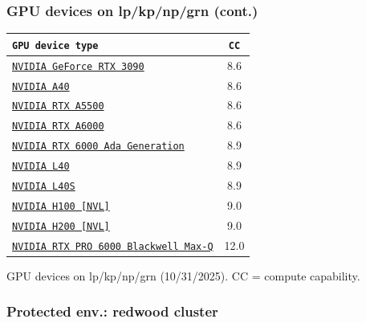 \begin{frame}
  \frametitle{GPU devices on lp/kp/np/grn (cont.)}
  \begin{center}
    \small
    \begin{tabular}{l|c}
      \texttt{GPU device type} & \texttt{CC} \\
      \hline
      \href{https://www.nvidia.com/en-us/geforce/graphics-cards/30-series/rtx-3090-3090ti/}{\texttt{NVIDIA GeForce RTX 3090}} & 8.6 \\
      \href{https://images.nvidia.com/content/Solutions/data-center/a40/nvidia-a40-datasheet.pdf}{\texttt{NVIDIA A40}} & 8.6 \\
      \href{https://www.nvidia.com/content/dam/en-zz/Solutions/gtcs22/design-visualization/quadro-product-literature/proviz-nvidia-rtx-a5500-datasheet-2130578-r3-us-web.pdf}{\texttt{NVIDIA RTX A5500}} & 8.6 \\
      \href{https://www.nvidia.com/en-us/design-visualization/rtx-a6000/}{\texttt{NVIDIA RTX A6000}} & 8.6 \\
      \href{https://www.nvidia.com/content/dam/en-zz/Solutions/design-visualization/rtx-6000/proviz-print-rtx6000-datasheet-web-2504660.pdf}{\texttt{NVIDIA RTX 6000 Ada Generation}} & 8.9 \\
      \href{https://www.nvidia.com/en-us/data-center/l40/}{\texttt{NVIDIA L40}} & 8.9 \\
      \href{https://resources.nvidia.com/en-us-l40s/l40s-datasheet-28413}{\texttt{NVIDIA L40S}} & 8.9 \\
      \href{https://www.nvidia.com/en-us/data-center/h100/}{\texttt{NVIDIA H100 [NVL]}} & 9.0 \\
      \href{https://www.nvidia.com/en-us/data-center/h200/}{\texttt{NVIDIA H200 [NVL]}} & 9.0 \\
      \href{https://www.nvidia.com/content/dam/en-zz/Solutions/products/workstations/professional-desktop-gpus/rtx-pro-6000-max-q/workstation-datasheet-blackwell-rtx-pro-6000-max-q-nvidia-3519233.pdf}{\texttt{NVIDIA RTX PRO 6000 Blackwell Max-Q}} & 12.0 \\
      \hline
    \end{tabular}
  \end{center}
  \par\small{GPU devices on lp/kp/np/grn (10/31/2025). CC = compute capability.}
\end{frame}

\subsubsection{Protected env.: redwood cluster}

